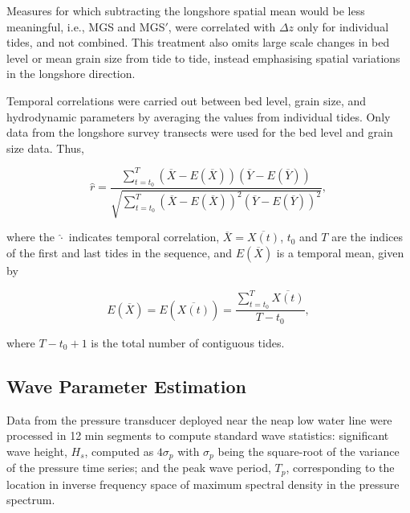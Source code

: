 Measures for which subtracting the longshore spatial mean would be less meaningful, i.e., MGS and MGS$'$, were correlated with $\Delta z$ only for individual tides, and not combined. This treatment also omits large scale changes in bed level or mean grain size from tide to tide, instead emphasising spatial variations in the longshore direction.

Temporal correlations were carried out between bed level, grain size, and hydrodynamic parameters by averaging the values from individual tides. Only data from the longshore survey transects were used for the bed level and grain size data. Thus,

\begin{equation}\label{eq:pearsons_r_time}
\hat{r} = \frac{\sum_{t=t_0}^{T}(\overline{X} - E(\overline{X}))(\overline{Y}-E(\overline{Y}))}{\sqrt{\sum_{t=t_0}^{T}(\overline{X}-E(\overline{X}))^2 (\overline{Y}-E(\overline{Y}))^2}},
\end{equation}

\noindent where the $\hat{\cdot}$ indicates temporal correlation, $\overline{X}=\overline{X(t)}$, $t_0$ and $T$ are the indices of the first and last tides in the sequence, and $E(\overline{X})$ is a temporal mean, given by

\begin{equation}\label{eq:time_mean}
E(\overline{X}) = E(\overline{X(t)}) = \frac{\sum_{t=t_0}^{T} \overline{X(t)}}{T-t_0},
\end{equation}

\noindent where $T-t_0+1$ is the total number of contiguous tides.


\subsection{Wave Parameter Estimation}

Data from the pressure transducer deployed near the neap low water line were processed in 12 min segments to compute standard wave statistics: significant wave height, $H_s$, computed as $4\sigma_p$ with $\sigma_p$ being the square-root of the variance of the pressure time series; and the peak wave period, $T_p$, corresponding to the location in inverse frequency space of maximum spectral density in the pressure spectrum. %


